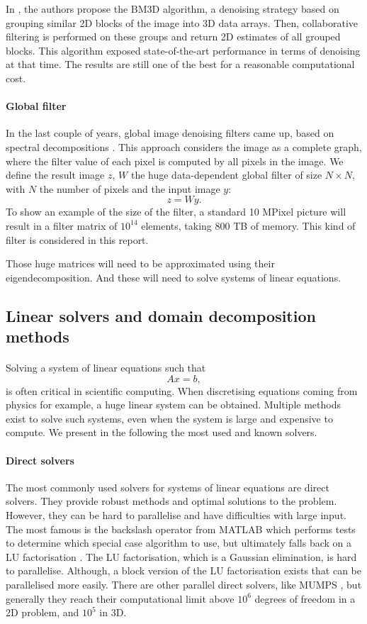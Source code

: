 In \cite{dabov_image_2007}, the authors propose the BM3D algorithm, a denoising strategy based on grouping similar 2D blocks of the image into 3D data arrays.
Then, collaborative filtering is performed on these groups and return 2D estimates of all grouped blocks.
This algorithm exposed state-of-the-art performance in terms of denoising at that time.
The results are still one of the best for a reasonable computational cost.

\paragraph{Global filter}
In the last couple of years, global image denoising filters came up, based on spectral decompositions \cite{glide_2014}.
This approach considers the image as a complete graph, where the filter value of each pixel is computed by all pixels in the image.
We define the result image \(z\), \(W\) the huge data-dependent global filter of size \(N \times N\), with \(N\) the number of pixels and the input image \(y\):
\[z = Wy.\]
To show an example of the size of the filter, a standard 10 MPixel picture will result in a filter matrix of \(10^{14}\) elements, taking 800 TB of memory.
This kind of filter is considered in this report.

Those huge matrices will need to be approximated using their eigendecomposition.
And these will need to solve systems of linear equations.

\subsection{Linear solvers and domain decomposition methods}

\paragraph{}
Solving a system of linear equations such that
\[Ax = b,\]
is often critical in scientific computing.
When discretising equations coming from physics for example, a huge linear system can be obtained.
Multiple methods exist to solve such systems, even when the system is large and expensive to compute.
We present in the following the most used and known solvers.

\paragraph{Direct solvers}
The most commonly used solvers for systems of linear equations are direct solvers.
They provide robust methods and optimal solutions to the problem.
However, they can be hard to parallelise and have difficulties with large input.
The most famous is the backslash operator from MATLAB which performs tests to determine which special case algorithm to use, but ultimately falls back on a LU factorisation \cite{mldivide_matlab}.
The LU factorisation, which is a Gaussian elimination, is hard to parallelise.
Although, a block version of the LU factorisation exists that can be parallelised more easily.
There are other parallel direct solvers, like MUMPS \cite{MUMPS_2001}, but generally they reach their computational limit above \(10^6\) degrees of freedom in a 2D problem, and \(10^5\) in 3D.

